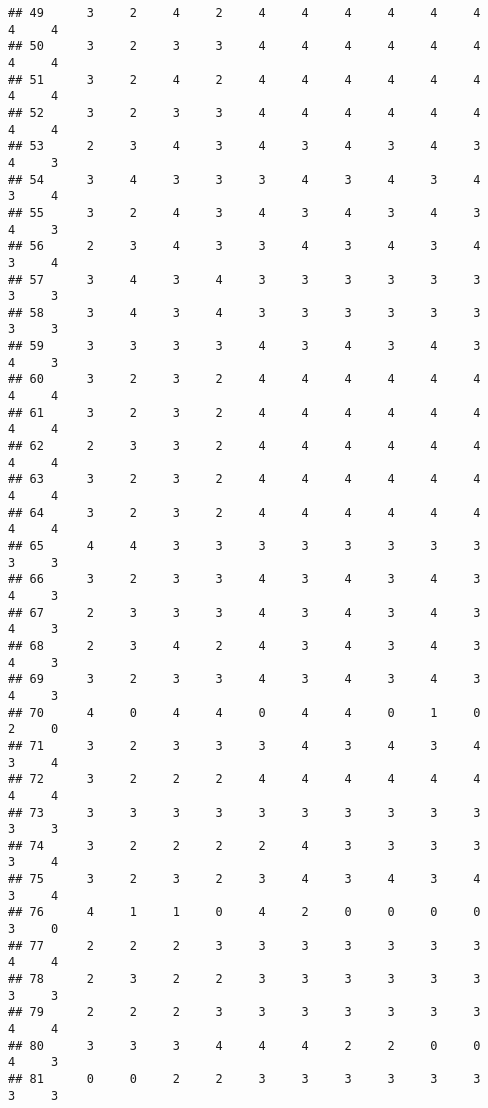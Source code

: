 \documentclass[
]{article}
\begin{document}
\begin{verbatim}
## 49      3     2     4     2     4     4     4     4     4     4     4     4
## 50      3     2     3     3     4     4     4     4     4     4     4     4
## 51      3     2     4     2     4     4     4     4     4     4     4     4
## 52      3     2     3     3     4     4     4     4     4     4     4     4
## 53      2     3     4     3     4     3     4     3     4     3     4     3
## 54      3     4     3     3     3     4     3     4     3     4     3     4
## 55      3     2     4     3     4     3     4     3     4     3     4     3
## 56      2     3     4     3     3     4     3     4     3     4     3     4
## 57      3     4     3     4     3     3     3     3     3     3     3     3
## 58      3     4     3     4     3     3     3     3     3     3     3     3
## 59      3     3     3     3     4     3     4     3     4     3     4     3
## 60      3     2     3     2     4     4     4     4     4     4     4     4
## 61      3     2     3     2     4     4     4     4     4     4     4     4
## 62      2     3     3     2     4     4     4     4     4     4     4     4
## 63      3     2     3     2     4     4     4     4     4     4     4     4
## 64      3     2     3     2     4     4     4     4     4     4     4     4
## 65      4     4     3     3     3     3     3     3     3     3     3     3
## 66      3     2     3     3     4     3     4     3     4     3     4     3
## 67      2     3     3     3     4     3     4     3     4     3     4     3
## 68      2     3     4     2     4     3     4     3     4     3     4     3
## 69      3     2     3     3     4     3     4     3     4     3     4     3
## 70      4     0     4     4     0     4     4     0     1     0     2     0
## 71      3     2     3     3     3     4     3     4     3     4     3     4
## 72      3     2     2     2     4     4     4     4     4     4     4     4
## 73      3     3     3     3     3     3     3     3     3     3     3     3
## 74      3     2     2     2     2     4     3     3     3     3     3     4
## 75      3     2     3     2     3     4     3     4     3     4     3     4
## 76      4     1     1     0     4     2     0     0     0     0     3     0
## 77      2     2     2     3     3     3     3     3     3     3     4     4
## 78      2     3     2     2     3     3     3     3     3     3     3     3
## 79      2     2     2     3     3     3     3     3     3     3     4     4
## 80      3     3     3     4     4     4     2     2     0     0     4     3
## 81      0     0     2     2     3     3     3     3     3     3     3     3

\end{verbatim}
\end{document}
